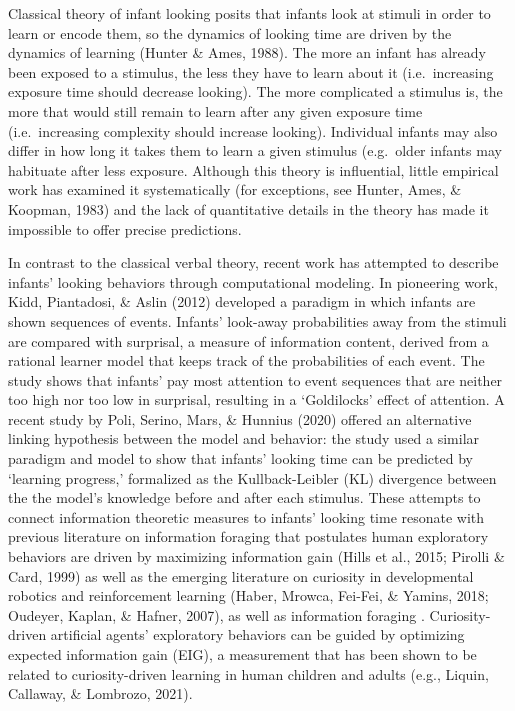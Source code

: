\documentclass[10pt, letterpaper]{article}
\begin{document}
Classical theory of infant looking posits that infants look at stimuli
in order to learn or encode them, so the dynamics of looking time are
driven by the dynamics of learning (Hunter \& Ames, 1988). The more an
infant has already been exposed to a stimulus, the less they have to
learn about it (i.e.~increasing exposure time should decrease looking).
The more complicated a stimulus is, the more that would still remain to
learn after any given exposure time (i.e.~increasing complexity should
increase looking). Individual infants may also differ in how long it
takes them to learn a given stimulus (e.g.~older infants may habituate
after less exposure. Although this theory is influential, little
empirical work has examined it systematically (for exceptions, see
Hunter, Ames, \& Koopman, 1983) and the lack of quantitative details in
the theory has made it impossible to offer precise predictions.

In contrast to the classical verbal theory, recent work has attempted to
describe infants' looking behaviors through computational modeling. In
pioneering work, Kidd, Piantadosi, \& Aslin (2012) developed a paradigm
in which infants are shown sequences of events. Infants' look-away
probabilities away from the stimuli are compared with surprisal, a
measure of information content, derived from a rational learner model
that keeps track of the probabilities of each event. The study shows
that infants' pay most attention to event sequences that are neither too
high nor too low in surprisal, resulting in a `Goldilocks' effect of
attention. A recent study by Poli, Serino, Mars, \& Hunnius (2020)
offered an alternative linking hypothesis between the model and
behavior: the study used a similar paradigm and model to show that
infants' looking time can be predicted by `learning progress,'
formalized as the Kullback-Leibler (KL) divergence between the the
model's knowledge before and after each stimulus. These attempts to
connect information theoretic measures to infants' looking time resonate
with previous literature on information foraging that postulates human
exploratory behaviors are driven by maximizing information gain (Hills
et al., 2015; Pirolli \& Card, 1999) as well as the emerging literature
on curiosity in developmental robotics and reinforcement learning
(Haber, Mrowca, Fei-Fei, \& Yamins, 2018; Oudeyer, Kaplan, \& Hafner,
2007), as well as information foraging . Curiosity-driven artificial
agents' exploratory behaviors can be guided by optimizing expected
information gain (EIG), a measurement that has been shown to be related
to curiosity-driven learning in human children and adults (e.g., Liquin,
Callaway, \& Lombrozo, 2021).
\end{document}
